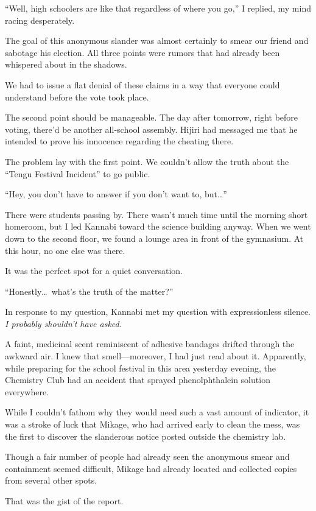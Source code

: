 \documentclass[
    a4paper,
    12pt,
    twoside,
    openany,
    UTF8,
    fontset=windows
]{ctexbook}
\begin{document}
``Well, high schoolers are like that regardless of where you go,'' I replied, my mind racing desperately.

The goal of this anonymous slander was almost certainly to smear our friend and sabotage his election. All three points were rumors that had already been whispered about in the shadows.

We had to issue a flat denial of these claims in a way that everyone could understand before the vote took place.

The second point should be manageable. The day after tomorrow, right before voting, there'd be another all-school assembly. Hijiri had messaged me that he intended to prove his innocence regarding the cheating there.

The problem lay with the first point. We couldn't allow the truth about the ``Tengu Festival Incident'' to go public.

``Hey, you don't have to answer if you don't want to, but\dots''

There were students passing by. There wasn't much time until the morning short homeroom, but I led Kannabi toward the science building anyway. When we went down to the second floor, we found a lounge area in front of the gymnasium. At this hour, no one else was there.

It was the perfect spot for a quiet conversation.

``Honestly\dots\ what's the truth of the matter?''

In response to my question, Kannabi met my question with expressionless silence. \textit{I probably shouldn't have asked.}

A faint, medicinal scent reminiscent of adhesive bandages drifted through the awkward air. I knew that smell---moreover, I had just read about it. Apparently, while preparing for the school festival in this area yesterday evening, the Chemistry Club had an accident that sprayed phenolphthalein solution everywhere.

While I couldn't fathom why they would need such a vast amount of indicator, it was a stroke of luck that Mikage, who had arrived early to clean the mess, was the first to discover the slanderous notice posted outside the chemistry lab.

Though a fair number of people had already seen the anonymous smear and containment seemed difficult, Mikage had already located and collected copies from several other spots. 

That was the gist of the report.
\end{document}
